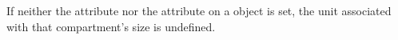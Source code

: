 If neither the attribute  nor the attribute
 on a \Compartment object is set, the unit
associated with that compartment's size is undefined.

